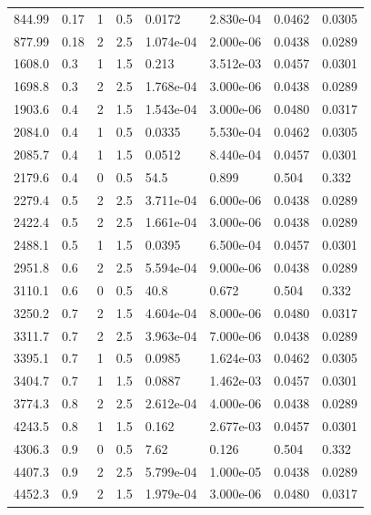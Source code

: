 \documentclass[preview]{standalone}
\begin{document}
{{\begin{tabular}{L{1.2cm}C{1.2cm} C{0.3cm}C{0.5cm} C{1.4cm}C{1.4cm} C{1.4cm}C{1.4cm}}
  844.99  &  0.17  & 1     & 0.5 &  0.0172  & 2.830e-04  & 0.0462 &  0.0305   \\ 
  877.99  &  0.18  & 2     & 2.5 &  1.074e-04  & 2.000e-06  & 0.0438 &  0.0289   \\ 
  1608.0  &   0.3  & 1     & 1.5 &  0.213  & 3.512e-03  & 0.0457 &  0.0301   \\ 
  1698.8  &   0.3  & 2     & 2.5 &  1.768e-04  & 3.000e-06  & 0.0438 &  0.0289   \\ 
  1903.6  &   0.4  & 2     & 1.5 &  1.543e-04  & 3.000e-06  & 0.0480 &  0.0317   \\ 
  2084.0  &   0.4  & 1     & 0.5 &  0.0335  & 5.530e-04  & 0.0462 &  0.0305   \\ 
  2085.7  &   0.4  & 1     & 1.5 &  0.0512  & 8.440e-04  & 0.0457 &  0.0301   \\ 
  2179.6  &   0.4  & 0     & 0.5 &  54.5  & 0.899  & 0.504 &  0.332   \\ 
  2279.4  &   0.5  & 2     & 2.5 &  3.711e-04  & 6.000e-06  & 0.0438 &  0.0289   \\ 
  2422.4  &   0.5  & 2     & 2.5 &  1.661e-04  & 3.000e-06  & 0.0438 &  0.0289   \\ 
  2488.1  &   0.5  & 1     & 1.5 &  0.0395  & 6.500e-04  & 0.0457 &  0.0301   \\ 
  2951.8  &   0.6  & 2     & 2.5 &  5.594e-04  & 9.000e-06  & 0.0438 &  0.0289   \\ 
  3110.1  &   0.6  & 0     & 0.5 &  40.8  & 0.672  & 0.504 &  0.332   \\ 
  3250.2  &   0.7  & 2     & 1.5 &  4.604e-04  & 8.000e-06  & 0.0480 &  0.0317   \\ 
  3311.7  &   0.7  & 2     & 2.5 &  3.963e-04  & 7.000e-06  & 0.0438 &  0.0289   \\ 
  3395.1  &   0.7  & 1     & 0.5 &  0.0985  & 1.624e-03  & 0.0462 &  0.0305   \\ 
  3404.7  &   0.7  & 1     & 1.5 &  0.0887  & 1.462e-03  & 0.0457 &  0.0301   \\ 
  3774.3  &   0.8  & 2     & 2.5 &  2.612e-04  & 4.000e-06  & 0.0438 &  0.0289   \\ 
  4243.5  &   0.8  & 1     & 1.5 &  0.162  & 2.677e-03  & 0.0457 &  0.0301   \\ 
  4306.3  &   0.9  & 0     & 0.5 &  7.62  & 0.126  & 0.504 &  0.332   \\ 
  4407.3  &   0.9  & 2     & 2.5 &  5.799e-04  & 1.000e-05  & 0.0438 &  0.0289   \\ 
  4452.3  &   0.9  & 2     & 1.5 &  1.979e-04  & 3.000e-06  & 0.0480 &  0.0317   \\ 

\end{tabular}}}
\end{document}
